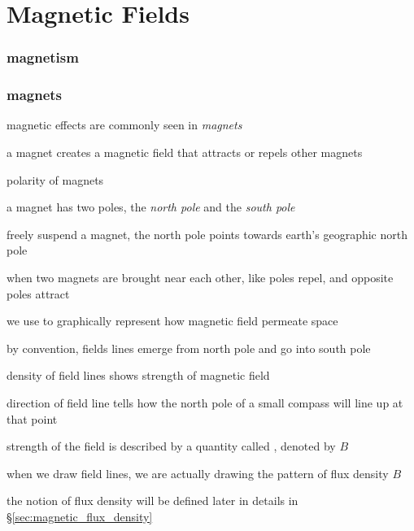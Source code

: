 \chapter{Magnetic Fields}

\subsection{magnetism}

\subsection{magnets}

magnetic effects are commonly seen in \emph{magnets}

a magnet creates a magnetic field that attracts or repels other magnets

\cmt polarity of magnets

a magnet has two poles, the \emph{north pole} and the \emph{south pole}

freely suspend a magnet, the north pole points towards earth's geographic north pole

when two magnets are brought near each other, like poles repel, and opposite poles attract

\cmt we use  to graphically represent how magnetic field permeate space

by convention, fields lines emerge from north pole and go into south pole

density of field lines shows strength of magnetic field

direction of field line tells how the north pole of a small compass will line up at that point

\cmt strength of the field is described by a quantity called , denoted by $B$

when we draw field lines, we are actually drawing the pattern of flux density $B$

the notion of flux density will be defined later in details in \S\ref{sec:magnetic_flux_density}


